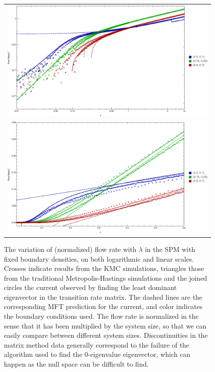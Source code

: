 \documentclass[
reprint, amsmath,amssymb,
]{revtex4-1}
\begin{document}
\begin{figure}[h!]
\vspace{0em}
\begin{center}
 \begin{tabular}{c}
    \includegraphics[width=1\linewidth]{allData} \\
    \includegraphics[width=1\linewidth]{allDataLinear}
    \end{tabular}
\end{center}
\caption{\label{fig:lambdaScans} The variation of (normalized) flow rate with $\lambda$ in the SPM with fixed boundary densities, on both logarithmic and linear scales.
Crosses indicate results from the KMC simulations, triangles those from the traditional
Metropolis-Hastings simulations and the joined circles the current observed by finding the least dominant eigenvector in the transition rate matrix. The dashed lines are the corresponding MFT prediction for the current,
and color indicates the boundary conditions used. The flow rate is normalized in the sense that it has been multiplied by the system size, so that we can easily compare between different system sizes.
Discontinuities in the matrix method data generally correspond to the failure of the algorithm used to find the $0$-eigenvalue eigenvector, which can happen as the null space can be difficult to find.
}
    \vspace{0em}
\end{figure}
\end{document}
